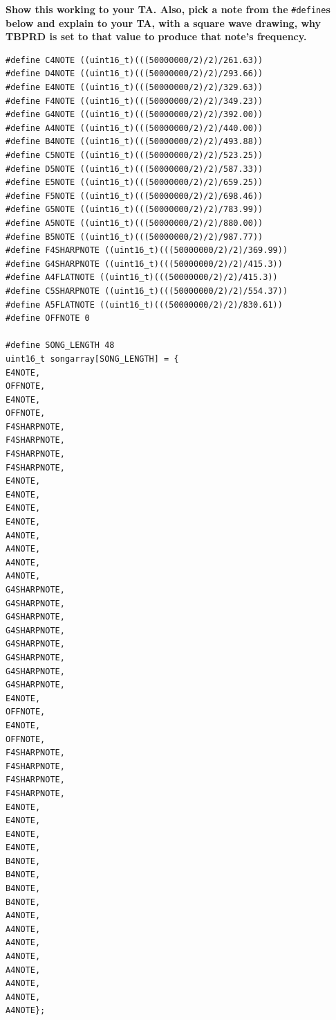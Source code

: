 \documentclass[11pt]{article}
\begin{document}
\textbf{Show this working to your TA. Also, pick a note from the }\texttt{#define}\textbf{s below and explain to your TA, with a square wave drawing, why TBPRD is set to that value to produce that note’s frequency.}
%
\begin{verbatim}
#define C4NOTE ((uint16_t)(((50000000/2)/2)/261.63))
#define D4NOTE ((uint16_t)(((50000000/2)/2)/293.66))
#define E4NOTE ((uint16_t)(((50000000/2)/2)/329.63))
#define F4NOTE ((uint16_t)(((50000000/2)/2)/349.23))
#define G4NOTE ((uint16_t)(((50000000/2)/2)/392.00))
#define A4NOTE ((uint16_t)(((50000000/2)/2)/440.00))
#define B4NOTE ((uint16_t)(((50000000/2)/2)/493.88))
#define C5NOTE ((uint16_t)(((50000000/2)/2)/523.25))
#define D5NOTE ((uint16_t)(((50000000/2)/2)/587.33))
#define E5NOTE ((uint16_t)(((50000000/2)/2)/659.25))
#define F5NOTE ((uint16_t)(((50000000/2)/2)/698.46))
#define G5NOTE ((uint16_t)(((50000000/2)/2)/783.99))
#define A5NOTE ((uint16_t)(((50000000/2)/2)/880.00))
#define B5NOTE ((uint16_t)(((50000000/2)/2)/987.77))
#define F4SHARPNOTE ((uint16_t)(((50000000/2)/2)/369.99))
#define G4SHARPNOTE ((uint16_t)(((50000000/2)/2)/415.3))
#define A4FLATNOTE ((uint16_t)(((50000000/2)/2)/415.3))
#define C5SHARPNOTE ((uint16_t)(((50000000/2)/2)/554.37))
#define A5FLATNOTE ((uint16_t)(((50000000/2)/2)/830.61))
#define OFFNOTE 0

#define SONG_LENGTH 48
uint16_t songarray[SONG_LENGTH] = {
E4NOTE,
OFFNOTE,
E4NOTE,
OFFNOTE,
F4SHARPNOTE,
F4SHARPNOTE,
F4SHARPNOTE,
F4SHARPNOTE,
E4NOTE,
E4NOTE,
E4NOTE,
E4NOTE,
A4NOTE,
A4NOTE,
A4NOTE,
A4NOTE,
G4SHARPNOTE,
G4SHARPNOTE,
G4SHARPNOTE,
G4SHARPNOTE,
G4SHARPNOTE,
G4SHARPNOTE,
G4SHARPNOTE,
G4SHARPNOTE,
E4NOTE,
OFFNOTE,
E4NOTE,
OFFNOTE,
F4SHARPNOTE,
F4SHARPNOTE,
F4SHARPNOTE,
F4SHARPNOTE,
E4NOTE,
E4NOTE,
E4NOTE,
E4NOTE,
B4NOTE,
B4NOTE,
B4NOTE,
B4NOTE,
A4NOTE,
A4NOTE,
A4NOTE,
A4NOTE,
A4NOTE,
A4NOTE,
A4NOTE,
A4NOTE};
\end{verbatim}
%
\end{document}

